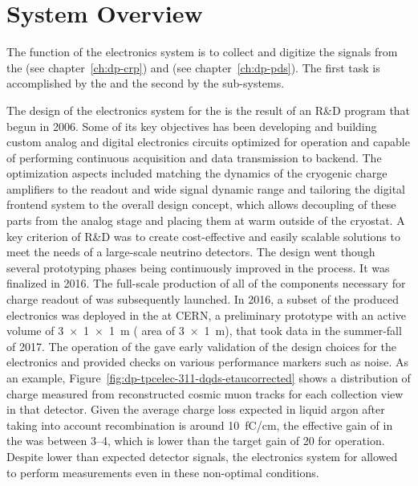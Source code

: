 \section{System Overview}
\label{sec:dp-tpcelec-overview}

The function of the   electronics system is to collect and digitize the signals from the  (see chapter~\ref{ch:dp-crp}) and  (see chapter~\ref{ch:dp-pds}). The first task is accomplished by the  and the second by the  sub-systems. 

The design of the electronics system for the   is the result of an R\&D program that begun in 2006. Some of its key objectives has been developing and building custom analog and digital electronics circuits optimized for  operation and capable of performing continuous acquisition and data transmission to  backend. The optimization aspects included matching the dynamics of the cryogenic charge amplifiers to the  readout and wide signal dynamic range and tailoring the digital frontend system to the overall  design concept, which allows decoupling of these parts from the analog stage and placing them at warm outside of the cryostat. A key criterion of R\&D was to create cost-effective and easily scalable solutions to meet the needs of a large-scale neutrino  detectors. The design went though several prototyping phases being continuously improved in the process. It was finalized in 2016. The full-scale production of all of the components necessary for charge readout of  was subsequently launched. In 2016, a subset of the produced electronics was deployed in the  at CERN, a preliminary \dual \lartpc prototype with an active volume  of \SI[product-units=power]{3x1x1}{m} ( area of \SI[product-units=power]{3x1}{m}), that took data in the summer-fall of 2017. The operation of the  \cite{Aimard:2018yxp} gave early validation of the design choices for the electronics and provided checks on various performance markers such as noise. As an example, Figure~\ref{fig:dp-tpcelec-311-dqds-etaucorrected} shows a distribution of charge measured from reconstructed cosmic muon tracks for each collection view in that detector. Given the average  charge loss expected in liquid argon after taking into account recombination is around \SI{10}{\femto\coulomb/\cm}, the effective gain of  in the  was between \numrange{3}{4}, which is lower than the target gain of \num{20} for  operation. Despite lower than expected detector signals, the electronics system for  allowed to perform measurements even in these non-optimal conditions.

